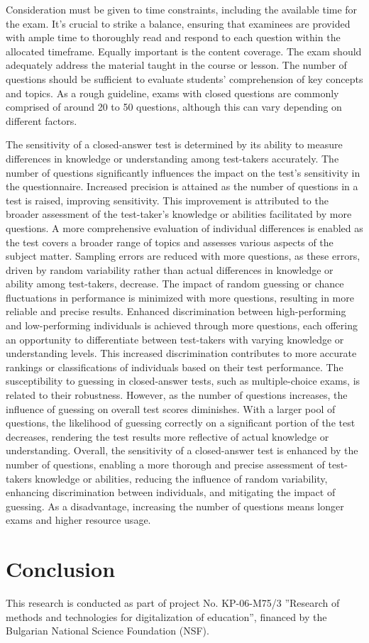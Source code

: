 \documentclass[aip,cp,amsmath,amssymb,reprint,]{revtex4-2}
\begin{document}
Consideration must be given to time constraints, including the available time for the exam. It's crucial to strike a balance, ensuring that examinees are provided with ample time to thoroughly read and respond to each question within the allocated timeframe. Equally important is the content coverage. The exam should adequately address the material taught in the course or lesson. The number of questions should be sufficient to evaluate students' comprehension of key concepts and topics. As a rough guideline, exams with closed questions are commonly comprised of around 20 to 50 questions, although this can vary depending on different factors.

The sensitivity of a closed-answer test is determined by its ability to measure differences in knowledge or understanding among test-takers accurately. The number of questions significantly influences the impact on the test's sensitivity in the questionnaire. Increased precision is attained as the number of questions in a test is raised, improving sensitivity. This improvement is attributed to the broader assessment of the test-taker's knowledge or abilities facilitated by more questions. A more comprehensive evaluation of individual differences is enabled as the test covers a broader range of topics and assesses various aspects of the subject matter. Sampling errors are reduced with more questions, as these errors, driven by random variability rather than actual differences in knowledge or ability among test-takers, decrease. The impact of random guessing or chance fluctuations in performance is minimized with more questions, resulting in more reliable and precise results. Enhanced discrimination between high-performing and low-performing individuals is achieved through more questions, each offering an opportunity to differentiate between test-takers with varying knowledge or understanding levels. This increased discrimination contributes to more accurate rankings or classifications of individuals based on their test performance. The susceptibility to guessing in closed-answer tests, such as multiple-choice exams, is related to their robustness. However, as the number of questions increases, the influence of guessing on overall test scores diminishes. With a larger pool of questions, the likelihood of guessing correctly on a significant portion of the test decreases, rendering the test results more reflective of actual knowledge or understanding. Overall, the sensitivity of a closed-answer test is enhanced by the number of questions, enabling a more thorough and precise assessment of test-takers knowledge or abilities, reducing the influence of random variability, enhancing discrimination between individuals, and mitigating the impact of guessing. As a disadvantage, increasing the number of questions means longer exams and higher resource usage.

\section{Conclusion}

\begin{acknowledgments}
This research is conducted as part of project No. KP-06-M75/3 ''Research of methods and technologies for digitalization of education'', financed by the Bulgarian National Science Foundation (NSF).
\end{acknowledgments}

\nocite{*}

\end{document}
